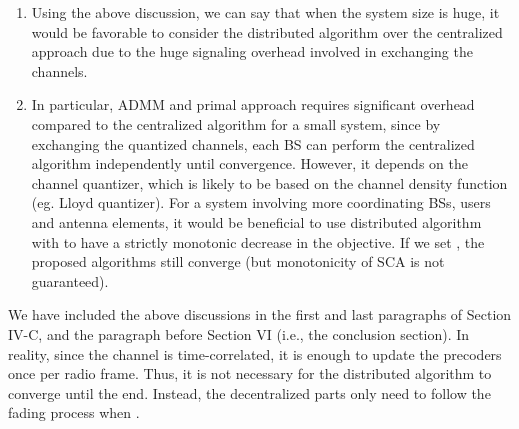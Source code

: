 \begin{enumerate}
\begin{enumerate}
		In this example, for the same amount of signaling overhead as in centralized method, we can performance only up to 6 SCA updates for  (\textit{i.e.}, two updates for ADMM part). This may not be sufficient for the distributed algorithms to attain the same performance as the centralized method. However, as the number of sub-channels, users and/or the antenna element increases, it may not be a feasible option to feedback the \ac{CSI} across the coordinating \acp{BS} to the centralized controller. In addition to comparing the signaling overhead, we also need to consider the effects of the quantization of the \ac{CSI} on the performance of a centralized algorithm, which is beyond the scope of our paper. Generally, the performance is significantly degraded if the \ac{CSI} is quantized \cite{nam_robust}. Moreover, in the centralized algorithm, resulting transmit precoders need to be exchanged with the corresponding \acp{BS} before the actual transmission, involving huge overhead in the backhaul.
		
		\item Using the above discussion, we can say that when the system size is huge, it would be favorable to consider the distributed algorithm over the centralized approach due to the huge signaling overhead involved in exchanging the channels.
		
		\item In particular, \ac{ADMM} and primal approach requires significant overhead compared to the centralized algorithm for a small system, since by exchanging the quantized channels, each \ac{BS} can perform the centralized algorithm independently until convergence. However, it depends on the channel quantizer, which is likely to be based on the channel density function (eg. Lloyd quantizer). For a system involving more coordinating \acp{BS}, users and antenna elements, it would be beneficial to use distributed algorithm with  to have a strictly monotonic decrease in the objective. If we set , the proposed algorithms still converge (but monotonicity of SCA is not guaranteed).
		
	\end{enumerate}
	
	We have included the above discussions in the first and last paragraphs of Section IV-C, and the paragraph before Section VI (i.e., the conclusion section). In reality, since the channel is time-correlated, it is enough to update the precoders once per radio frame. Thus, it is not necessary for the distributed algorithm to converge until the end. Instead, the decentralized parts only need to follow the fading process when . 
	

\end{enumerate}
